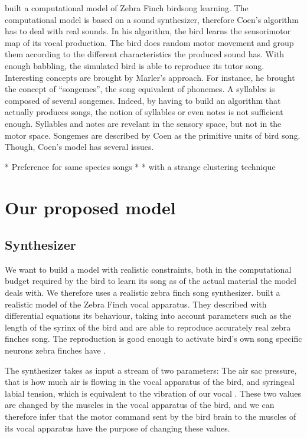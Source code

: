 {\textcite{marler_three_1997} built a computational model of Zebra Finch birdsong
learning. The computational model is based on a sound synthesizer, therefore
Coen's algorithm has to deal with real sounds. In his algorithm, the bird learns
the sensorimotor map of its vocal production. The bird does random motor
movement and group them according to the different characteristics the produced
sound has. With enough babbling, the simulated bird is able to reproduce its
tutor song. Interesting concepts are brought by Marler's approach. For instance,
he brought the concept of ``songemes'', the song equivalent of phonemes. A
syllables is composed of several songemes. Indeed, by having to build an
algorithm that actually produces songs, the notion of syllables or even notes is
not sufficient enough. Syllables and notes are revelant in the sensory space,
but not in the motor space. Songemes are described by Coen as the primitive
units of bird song. Though, Coen's model has several issues.

* Preference for same species songs \cite{margoliash_evaluating_2002,
marler_three_1997}
* \cite{marler_three_1997}
* \cite{coen_learning_2007} with a strange clustering technique



\chapter{Our proposed model}

\section{Synthesizer}

We want to build a model with realistic constraints, both in the computational
budget required by the bird to learn its song as of the actual material the
model deals with. We therefore uses a realistic zebra finch song synthesizer.
\textcite{perl_reconstruction_2011} built a realistic model of the Zebra Finch
vocal apparatus. They described with differential equations its behaviour,
taking into account parameters such as the length of the syrinx of the bird
 and are able to reproduce accurately real zebra finches
song. The reproduction is good enough to activate bird's own song specific
neurons zebra finches have \parencite{boari_automatic_2015}.

The synthesizer takes as input a stream of two parameters: The air sac pressure,
that is how much air is flowing in the vocal apparatus of the bird, and
syringeal labial tension, which is equivalent to the vibration of our vocal
. These two values are changed by the muscles in the vocal
apparatus of the bird, and we can therefore infer that the motor command sent by
the bird brain to the muscles of its vocal apparatus have the purpose of
changing these values.

}
